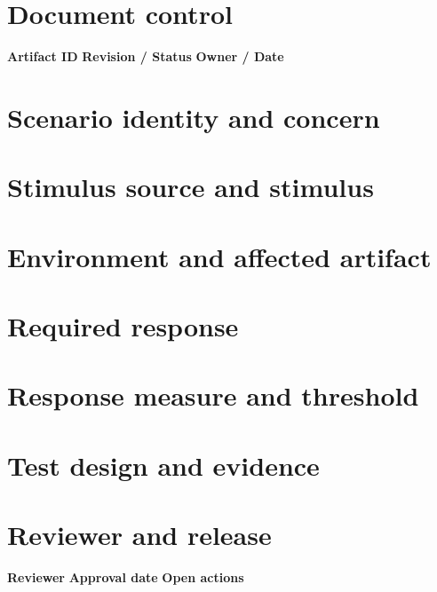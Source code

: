 \documentclass[10pt,letterpaper]{article}
\begin{document}
\DocProvenance
\section{Document control}
\textbf{Artifact ID}
\textbf{Revision / Status}
\textbf{Owner / Date}
\section{Scenario identity and concern}
\section{Stimulus source and stimulus}
\section{Environment and affected artifact}
\section{Required response}
\section{Response measure and threshold}
\section{Test design and evidence}
\section{Reviewer and release}
\textbf{Reviewer}
\textbf{Approval date}
\textbf{Open actions}
\end{document}
